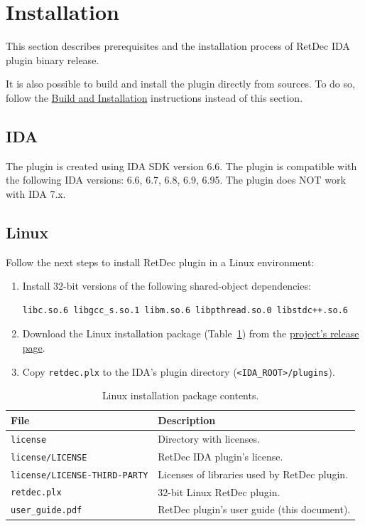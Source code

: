 \documentclass[pdftex, a4paper,12pt, oneside, svgnames]{article}
\begin{document}
\newpage
\section{Installation}
\label{sec:installation}
This section describes prerequisites and the installation process of RetDec IDA plugin binary release.

It is also possible to build and install the plugin directly from sources. To do so, follow the \href{https://github.com/avast-tl/retdec-idaplugin#build-and-installation}{Build and Installation} instructions instead of this section.

\subsection{IDA}
The plugin is created using IDA SDK version 6.6. The plugin is compatible with the following IDA versions: 6.6, 6.7, 6.8, 6.9, 6.95. The plugin does NOT work with IDA 7.x.

\subsection{Linux}
Follow the next steps to install RetDec plugin in a Linux environment:
\begin{enumerate}
	\item Install 32-bit versions of the following shared-object dependencies:
\begin{verbatim}
libc.so.6 libgcc_s.so.1 libm.so.6 libpthread.so.0 libstdc++.so.6
\end{verbatim}
	\item Download the Linux installation package (Table~\ref{table:installation-package-linux}) from the \href{https://github.com/avast-tl/retdec-idaplugin/releases}{project's release page}.
	\item Copy \texttt{retdec.plx} to the IDA's plugin directory (\texttt{<IDA\_ROOT>/plugins}).
\end{enumerate}

\begin{table}[!ht]
\centering
\caption{Linux installation package contents.}
\label{table:installation-package-linux}
\begin{tabular}{ll}
\textbf{File} & \textbf{Description}\\
\hline
\texttt{license} & Directory with licenses. \\
\texttt{license/LICENSE} & RetDec IDA plugin's license. \\
\texttt{license/LICENSE-THIRD-PARTY} & Licenses of libraries used by RetDec plugin. \\
\texttt{retdec.plx} & 32-bit Linux RetDec plugin. \\
\texttt{user_guide.pdf} & RetDec plugin's user guide (this document). \\
\end{tabular}
\end{table}
\end{document}
